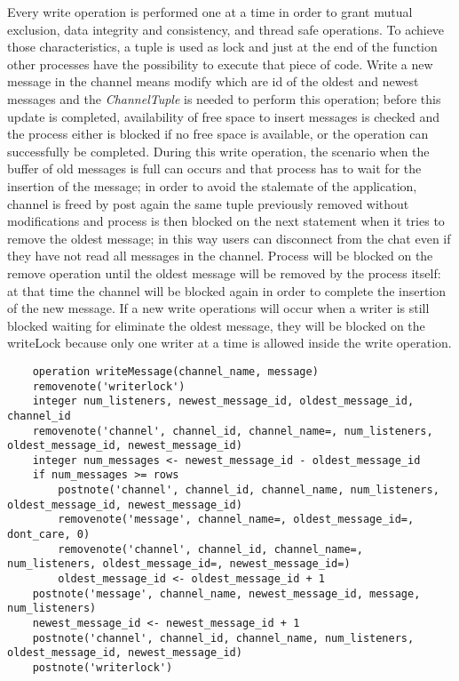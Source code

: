 \documentclass[10pt,a4paper]{article}
\begin{document}
Every write operation is performed one at a time in order to grant mutual exclusion, data integrity and consistency, and thread safe operations. To achieve those characteristics, a tuple is used as lock and just at the end of the function other processes have the possibility to execute that piece of code.
Write a new message in the channel means modify which are id of the oldest and newest messages and the \textit{ChannelTuple} is needed to perform this operation; before this update is completed, availability of free space to insert messages is checked and the process either is blocked if no free space is available, or the operation can successfully be completed.
During this write operation, the scenario when the buffer of old messages is full can occurs and that process has to wait for the insertion of the message; in order to avoid the stalemate of the application, channel is freed by post again the same tuple previously removed without modifications and process is then blocked on the next statement when it tries to remove the oldest message; in this way users can disconnect from the chat even if they have not read all messages in the channel. Process will be blocked on the remove operation until the oldest message will be removed by the process itself: at that time the channel will be blocked again in order to complete the insertion of the new message.
If a new write operations will occur when a writer is still blocked waiting for eliminate the oldest message, they will be blocked on the writeLock because only one writer at a time is allowed inside the write operation.

\begin{verbatim}
	operation writeMessage(channel_name, message)
	removenote('writerlock')
	integer num_listeners, newest_message_id, oldest_message_id, channel_id
	removenote('channel', channel_id, channel_name=, num_listeners, oldest_message_id, newest_message_id)
	integer num_messages <- newest_message_id - oldest_message_id
	if num_messages >= rows
		postnote('channel', channel_id, channel_name, num_listeners, oldest_message_id, newest_message_id)
		removenote('message', channel_name=, oldest_message_id=, dont_care, 0)
		removenote('channel', channel_id, channel_name=, num_listeners, oldest_message_id=, newest_message_id=)
		oldest_message_id <- oldest_message_id + 1
	postnote('message', channel_name, newest_message_id, message, num_listeners)
	newest_message_id <- newest_message_id + 1
	postnote('channel', channel_id, channel_name, num_listeners, oldest_message_id, newest_message_id)
	postnote('writerlock')
\end{verbatim}
\end{document}
